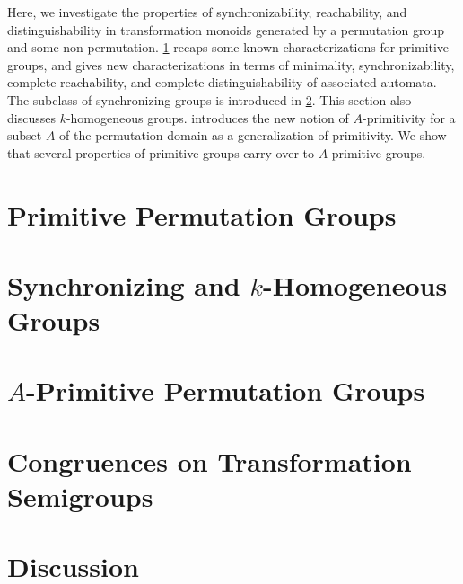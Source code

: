  
Here, we investigate the properties of synchronizability, reachability, and distinguishability
in transformation monoids generated by a permutation group
and some non-permutation.
\cref{sec:prim_groups}
recaps some known characterizations for primitive groups, and gives new characterizations
in terms of minimality, synchronizability, complete reachability,
and complete distinguishability of associated automata. 
The subclass of synchronizing groups
is introduced in \cref{sync_max:perm:sec:sync_grps}. This section also discusses $k$-homogeneous groups.
introduces the new notion of $A$-primitivity for a subset $A$
of the permutation domain as a generalization of primitivity.
We show that several properties of primitive groups carry over to $A$-primitive groups.

\section{Primitive Permutation Groups}
\label{sec:prim_groups}



\section{Synchronizing and $k$-Homogeneous Groups}
\label{sync_max:perm:sec:sync_grps} 



\section{\texorpdfstring{$A$}{A}-Primitive Permutation Groups}
\label{sec:A-primitive} 



\section{Congruences on Transformation Semigroups}
\label{syncmax:perm:sec:congruences}



\section{Discussion}
\label{sync_max:app:discussion}

